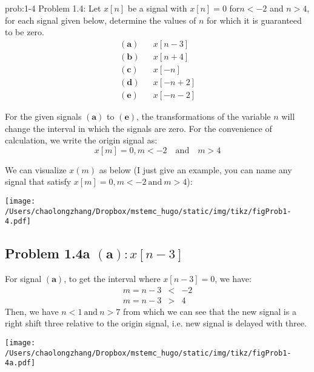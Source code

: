 \documentclass[koma,a4paper,utopia,12pt,listings-color,microtype,paralist,colorlinks,urlcolor=red]{org-article}
\begin{document}
\begin{prob}[]{prob:1-4}
 Problem 1.4: Let \(x[n]\) be a signal with \(x[n]=0\) for\(n< -2\) and \(n>4\),
for each signal given below, determine the values of \(n\) for which it is
guaranteed to be zero.
\begin{eqnarray*}
\mathbf{ (a) } & & x[n-3] \\
\mathbf{ (b) } & & x[n+4] \\
\mathbf{ (c) } & & x[-n]  \\
\mathbf{ (d) } & & x[-n+2] \\
\mathbf{ (e) } & & x[-n-2]
\end{eqnarray*}
\label{prob:1-4}
\end{prob}

For the given signals \(\mathbf{(a)}\) to \(\mathbf{(e)}\), the transformations
of the variable \(n\) will change the interval in which the signals are zero.
For the convenience of calculation, we write the origin signal as:
\begin{equation*}
x[m] = 0, m< -2 \quad \mathrm{and} \quad m>4
\end{equation*}

We can visualize \(x(m)\) as below (I just give an example, you can name any
signal that satisfy \(x[m] = 0, m< -2 \ \mathrm{and} \ m>4\)):

\begin{center}
\texttt{[image: /Users/chaolongzhang/Dropbox/mstemc\_hugo/static/img/tikz/figProb1-4.pdf]}
\end{center}


\subsection{Problem 1.4a \(\mathbf{(a)}:x[n-3]\)}
\label{sec:org897c6ea}

For signal \(\mathbf{(a)}\), to get the interval where \(x[n-3] = 0\), we have:
\begin{eqnarray*}
  m=n-3 &<& -2 \\
  m=n-3 &>& 4
\end{eqnarray*}
 Then, we have \(n < 1 \ \mathrm{and} \ n > 7\) from which we can see that
the new signal is a right shift three relative to the origin signal, i.e. new
signal is delayed with three.


\begin{center}
\texttt{[image: /Users/chaolongzhang/Dropbox/mstemc\_hugo/static/img/tikz/figProb1-4a.pdf]}
\end{center}
\end{document}
